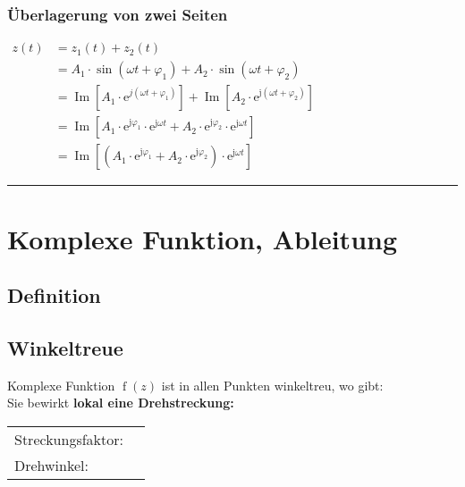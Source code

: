			\subsubsection{Überlagerung von zwei Seiten}
				$\begin{aligned} 
					z(t) &=z_{1}(t)+z_{2}(t) \\ &=A_{1} \cdot \sin \left(\omega t+\varphi_{1}\right)+A_{2} \cdot \sin \left(\omega t+\varphi_{2}\right) \\ &=\operatorname{Im}\left[A_{1} \cdot \mathrm{e}^{j\left(\omega t+\varphi_{1}\right)}\right]+\operatorname{Im}\left[A_{2} \cdot \mathrm{e}^{\mathrm{j}\left(\omega t+\varphi_{2}\right)}\right] \\ &=\operatorname{Im}\left[A_{1} \cdot \mathrm{e}^{\mathrm{j} \varphi_{1}} \cdot \mathrm{e}^{\mathrm{j} \omega t}+A_{2} \cdot \mathrm{e}^{\mathrm{j} \varphi_{2}} \cdot \mathrm{e}^{\mathrm{j} \omega t}\right] \\ &=\operatorname{Im}\left[\left(A_{1} \cdot \mathrm{e}^{\mathrm{j} \varphi_{1}}+A_{2} \cdot \mathrm{e}^{\mathrm{j} \varphi_{2}}\right) \cdot \mathrm{e}^{\mathrm{j} \omega t}\right] 
				\end{aligned}$
				\medskip
				\hrule
				\medskip
				
		\section{Komplexe Funktion, Ableitung}
			\begin{minipage}[t]{0.5\textwidth}
				\subsection{Definition}
					
			\end{minipage}
			\begin{minipage}[t]{0.5\textwidth}
				\subsection{Winkeltreue}
					Komplexe Funktion $\operatorname{f}\left( z \right)$ ist in allen Punkten winkeltreu, wo gibt: \\[6pt]
					Sie bewirkt \textbf{lokal eine Drehstreckung:}\\[3pt]
					\begin{tabular}{ll}
						Streckungsfaktor: & \fbox{$\left|f^{\prime}(z)\right|$}\\[3pt]
						Drehwinkel: & \fbox{$\operatorname{\arg}\left( z \right)$}\\[3pt]
					\end{tabular}
			\end{minipage}
